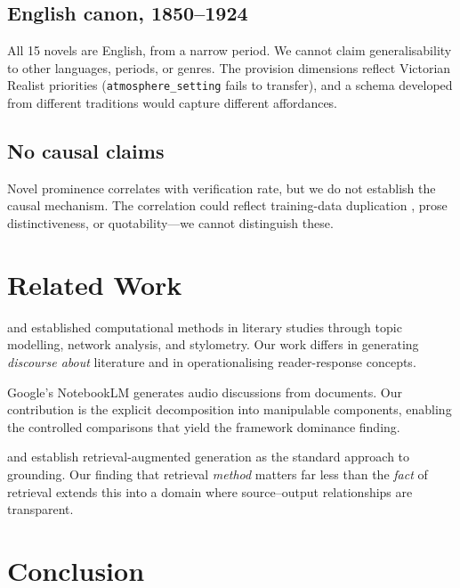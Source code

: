 \documentclass{article}
\begin{document}
\subsection{English canon, 1850--1924}

All 15 novels are English, from a narrow period.  We cannot claim
generalisability to other languages, periods, or genres.  The
provision dimensions reflect Victorian Realist priorities
(\texttt{atmosphere\_setting} fails to transfer), and a schema
developed from different traditions would capture different affordances.

\subsection{No causal claims}

Novel prominence correlates with verification rate, but we do not
establish the causal mechanism.  The correlation could reflect
training-data duplication \parencite{carlini2023quantifying}, prose
distinctiveness, or quotability---we cannot distinguish these.


\section{Related Work}
\label{sec:related}

\textcite{moretti2013distant} and \textcite{underwood2019distant}
established computational methods in literary studies through topic
modelling, network analysis, and stylometry.  Our work differs in
generating \emph{discourse about} literature and in operationalising
reader-response concepts.

Google's NotebookLM \parencite{notebooklm2024} generates audio
discussions from documents.  Our contribution is the explicit
decomposition into manipulable components, enabling the controlled
comparisons that yield the framework dominance finding.

\textcite{lewis2020rag} and \textcite{gao2024rag} establish
retrieval-augmented generation as the standard approach to grounding.
Our finding that retrieval \emph{method} matters far less than the
\emph{fact} of retrieval extends this into a domain where source--output
relationships are transparent.


\section{Conclusion}
\label{sec:conclusion}
\end{document}
